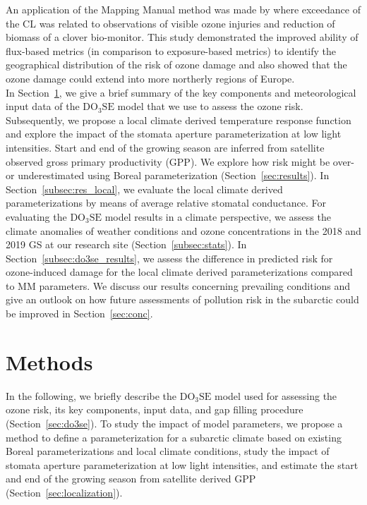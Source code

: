 \documentclass[bg, manuscript]{copernicus}
\begin{document}
An application of the Mapping Manual method was made by \citet{GCB:Mills2011} where exceedance of the CL was related to observations of visible ozone injuries and reduction of biomass of a clover bio-monitor. This study demonstrated the improved ability of flux-based metrics (in comparison to exposure-based metrics) to identify the geographical distribution of the risk of ozone damage and also showed that the ozone damage could extend into more northerly regions of Europe.\\

In Section~\ref{sec:dam}, we give a brief summary of the key components and meteorological input data of the $\mathrm{DO_3SE}$ model that we use to assess the ozone risk. Subsequently, we propose a local climate derived temperature response function and explore the impact of the stomata aperture parameterization at low light intensities. Start and end of the growing season are inferred from satellite observed gross primary productivity (GPP). We explore how risk might be over- or underestimated using Boreal parameterization (Section~\ref{sec:results}). In Section~\ref{subsec:res_local}, we evaluate the local climate derived parameterizations by means of average relative stomatal conductance. For evaluating the $\mathrm{DO_3SE}$ model results in a climate perspective, we assess the climate anomalies of weather conditions and ozone concentrations in the 2018 and 2019 GS at our research site (Section~\ref{subsec:stats}). In Section~\ref{subsec:do3se_results}, we assess the difference in predicted risk for ozone-induced damage for the local climate derived parameterizations compared to MM parameters. We discuss our results concerning prevailing conditions and give an outlook on how future assessments of pollution risk in the subarctic could be improved in Section~\ref{sec:conc}.

\section{Methods}
\label{sec:dam}
In the following, we briefly describe the $\mathrm{DO_3SE}$ model used for assessing the ozone risk, its key components, input data, and gap filling procedure (Section~\ref{sec:do3se}). To study the impact of model parameters, we propose a method to define a parameterization for a subarctic climate based on existing Boreal parameterizations and local climate conditions, study the impact of stomata aperture parameterization at low light intensities, and estimate the start and end of the growing season from satellite derived GPP (Section~\ref{sec:localization}).
\end{document}
